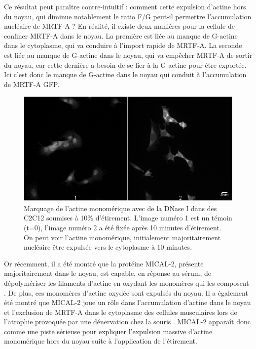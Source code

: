 Ce résultat peut paraître contre-intuitif : comment cette expulsion d'actine hors du noyau, qui diminue notablement le ratio F/G peut-il permettre l'accumulation nucléaire de MRTF-A ? En réalité, il existe deux manières pour la cellule de confiner MRTF-A dans le noyau. La première est liée au manque de G-actine dans le cytoplasme, qui va conduire à l'import rapide de MRTF-A. La seconde est liée au manque de G-actine dans le noyau, qui va empêcher MRTF-A de sortir du noyau, car cette dernière a besoin de se lier à la G-actine pour être exportée. Ici c'est donc le manque de G-actine dans le noyau qui conduit à l'accumulation de MRTF-A GFP. 

\begin{figure}
\includegraphics[scale=0.6]{Figures/Expusion2.png} 
\caption{\label{expulsion} Marquage de l'actine monomérique avec de la DNase I dans des C2C12 soumises à 10\% d'étirement. L'image numéro 1 est un témoin (t=0), l'image numéro 2 a été fixée après 10 minutes d'étirement. On peut voir l'actine monomérique, initialement majoritairement nucléaire être expulsée vers le cytoplasme à 10 minutes.}
\end{figure}
Or récemment, il a été montré que la protéine MICAL-2, présente majoritairement dans le noyau, est capable, en réponse au sérum, de dépolymériser les filaments d'actine en oxydant les monomères qui les composent \parencite{lundquist_redox_2014}. De plus, ces monomères d'actine oxydée sont expulsés du noyau. Il a également été montré que MICAL-2 joue un rôle dans l'accumulation d'actine dans le noyau et l'exclusion de MRTF-A dans le cytoplasme des cellules musculaires lors de l'atrophie provoquée par une dénervation chez la souris \parencite{collard_nuclear_2014}. MICAL-2 apparaît donc comme une piste sérieuse pour expliquer l'expulsion massive d'actine monomérique hors du noyau suite à l'application de l'étirement. 


